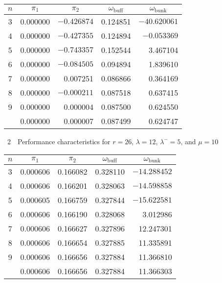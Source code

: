 \begin{multicols}{2}
{\small\begin{center}
\tabcolsep=6.8pt
\begin{tabular}{ccrcr}
\hline
$n$ & $\pi_{1}$ & \multicolumn{1}{c}{$\pi_{2}$} & $\omega_{\mathrm{buff}}$ & 
\multicolumn{1}{c}{$\omega_{\mathrm{bunk}}$}\\
\hline
3&      0.000000&  $ -0.426874$&      0.124851&   $-40.620061$\\
4&      0.000000&   $-0.427355$&  0.124894&   $-0.053369$\\
5&      0.000000&   $-0.743357$&      0.152544&   3.467104\\
6&      0.000000&   $-0.084505$&      0.094894&   1.839610\\
7&      0.000000&   0.007251&       0.086866&   0.364169\\
8&      0.000000&   $-0.000211$&      0.087518&   0.637415\\
9&      0.000000&   0.000004&       0.087500&   0.624550\\
\hline
&   0.000000&   0.000007&   0.087499&   0.624747\\
\hline
\end{tabular}
\end{center}}



\noindent
{{\tablename~2}\ \ \small{Performance characteristics for $r=26$, $\lambda=12$, $\lambda^-=5$, and
$\mu=10$}}
 
 \vspace*{-3pt}

{\small\begin{center}
\tabcolsep=7.5pt
\begin{tabular}{ccccr}
\hline
$n$ & $\pi_{1}$ & $\pi_{2}$ & $\omega_{\mathrm{buff}}$ & 
\multicolumn{1}{c}{$\omega_{\mathrm{bunk}}$}\\
\hline
3&  0.000606&   0.166082&   0.328110    &$-14.288452$\\
4&  0.000606&   0.166201&       0.328063&   $-14.598858$\\
5&      0.000605&   0.166759&   0.327844    &$-15.622581$\\
6&      0.000606&   0.166190&   0.328068    &3.012986\\
7&      0.000606&   0.166627&   0.327896    &12.247301\\
8&      0.000606&   0.166654&   0.327885    &11.335891\\
9&      0.000606&   0.166656&   0.327884    &11.366810\\
\hline
& 0.000606& 0.166656    &   0.327884    &11.366303\\
\hline
\end{tabular}
\end{center}}


\end{multicols}
